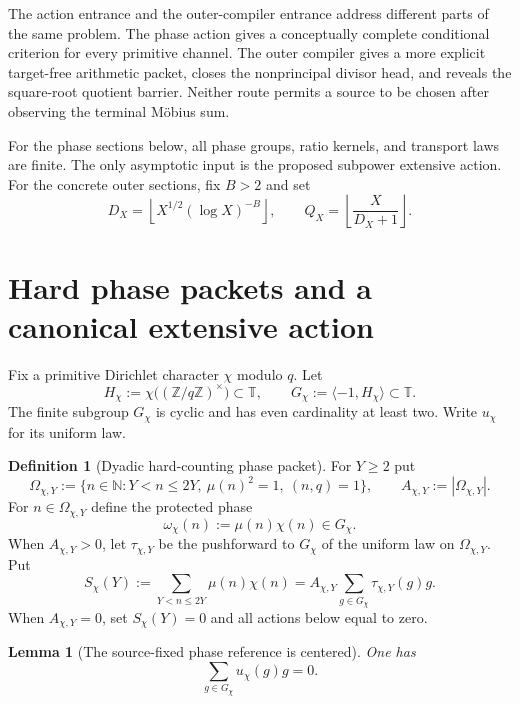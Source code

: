 \documentclass[11pt]{article}
\newtheorem{lemma}[theorem]{Lemma}
\theoremstyle{definition}
\newtheorem{definition}[theorem]{Definition}
\theoremstyle{remark}
\newcommand{\N}{\mathbb N}
\newcommand{\T}{\mathbb T}
\begin{document}
The action entrance and the outer-compiler entrance address different parts of
the same problem.  The phase action gives a conceptually complete conditional
criterion for every primitive channel.  The outer compiler gives a more
explicit target-free arithmetic packet, closes the nonprincipal divisor head,
and reveals the square-root quotient barrier.  Neither route permits a source
to be chosen after observing the terminal M\"obius sum.

For the phase sections below, all phase groups, ratio kernels, and transport
laws are finite.  The only asymptotic input is the proposed subpower extensive
action.  For the concrete outer sections, fix $B>2$ and set
\[
 D_X=\left\lfloor X^{1/2}(\log X)^{-B}\right\rfloor,
 \qquad
 Q_X=\left\lfloor\frac{X}{D_X+1}\right\rfloor.
 \tag{G.0}
\]


\section{Hard phase packets and a canonical extensive action}
\label{sec:hard-phase}

Fix a primitive Dirichlet character $\chi$ modulo $q$.  Let
\[
 H_\chi:=\chi\bigl((\mathbb Z/q\mathbb Z)^\times\bigr)\subset\T,
 \qquad
 G_\chi:=\langle-1,H_\chi\rangle\subset\T.
 \tag{2.1}
\]
The finite subgroup $G_\chi$ is cyclic and has even cardinality at least two.
Write $u_\chi$ for its uniform law.

\begin{definition}[Dyadic hard-counting phase packet]
For $Y\ge2$ put
\[
 \Omega_{\chi,Y}
 :=\{n\in\N:Y<n\le2Y,\ \mu(n)^2=1,\ (n,q)=1\},
 \qquad
 A_{\chi,Y}:=|\Omega_{\chi,Y}|.
 \tag{2.2}
\]
For $n\in\Omega_{\chi,Y}$ define the protected phase
\[
 \omega_\chi(n):=\mu(n)\chi(n)\in G_\chi.
 \tag{2.3}
\]
When $A_{\chi,Y}>0$, let $\tau_{\chi,Y}$ be the pushforward to $G_\chi$ of the
uniform law on $\Omega_{\chi,Y}$.  Put
\[
 S_\chi(Y):=\sum_{Y<n\le2Y}\mu(n)\chi(n)
 =A_{\chi,Y}\sum_{g\in G_\chi}\tau_{\chi,Y}(g)g.
 \tag{2.4}
\]
When $A_{\chi,Y}=0$, set $S_\chi(Y)=0$ and all actions below equal to zero.
\end{definition}

\begin{lemma}[The source-fixed phase reference is centered]
\label{lem:uniform-phase-centered}
One has
\[
 \boxed{\sum_{g\in G_\chi}u_\chi(g)g=0.}
 \tag{2.5}
\]
\end{lemma}
\end{document}
